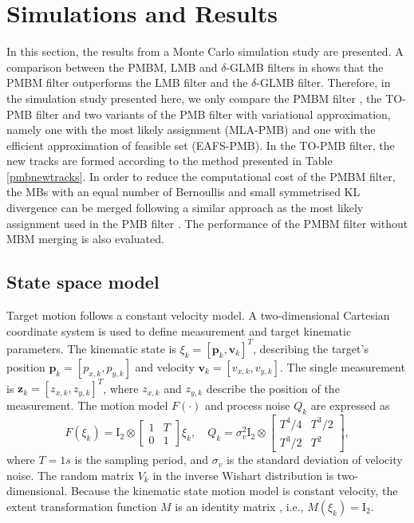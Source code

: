 \documentclass[journal]{IEEEtran}
\begin{document}
\section{Simulations and Results}
In this section, the results from a Monte Carlo simulation study are presented. A comparison between the PMBM, LMB and $\delta$-GLMB filters in \cite{pmbmextended2} shows that the PMBM filter outperforms the LMB filter and the $\delta$-GLMB filter. Therefore, in the simulation study presented here, we only compare the PMBM filter \cite{pmbmextended,pmbmextended2}, the TO-PMB filter and two variants of the PMB filter with variational approximation, namely one with the most likely assignment (MLA-PMB) and one with the efficient approximation of feasible set (EAFS-PMB). In the TO-PMB filter, the new tracks are formed according to the method presented in Table \ref{pmbnewtracks}. In order to reduce the computational cost of the PMBM filter, the MBs with an equal number of Bernoullis and small symmetrised KL divergence can be merged following a similar approach as the most likely assignment used in the PMB filter \cite{pmbmextended2}. The performance of the PMBM filter without MBM merging is also evaluated.

\subsection{State space model}
Target motion follows a constant velocity model. A two-dimensional Cartesian coordinate system is used to define measurement and target kinematic parameters. The kinematic state is $\xi_k = [\mathbf{p}_k,\mathbf{v}_k]^T$, describing the target's position $\mathbf{p}_k=[p_{x,k},p_{y,k}]$ and velocity $\mathbf{v}_k = [v_{x,k},v_{y,k}]$. The single measurement is  $\mathbf{z}_k=[z_{x,k},z_{y,k}]^T$, where $z_{x,k}$ and $z_{y,k}$ describe the position of the measurement. The motion model $F(\cdot)$ and process noise $Q_k$ are expressed as
\begin{equation*}
    F(\xi_k)=\text{I}_2 \otimes \begin{bmatrix}
        1 & T\\
        0 & 1
    \end{bmatrix}\xi_k, \quad Q_k =  \sigma_v^2\text{I}_2\otimes\begin{bmatrix}
        T^4/4 & T^3/2\\
        T^3/2 & T^2
    \end{bmatrix},
\end{equation*}
where $T=1s$ is the sampling period, and $\sigma_v$ is the standard deviation of velocity noise. The random matrix $V_k$ in the inverse Wishart distribution is two-dimensional. Because the kinematic state motion model is constant velocity, the extent transformation function $M$ is an identity matrix \cite{pmbmextended2}, i.e., $M(\xi_k) = \text{I}_2$. 
\end{document}
